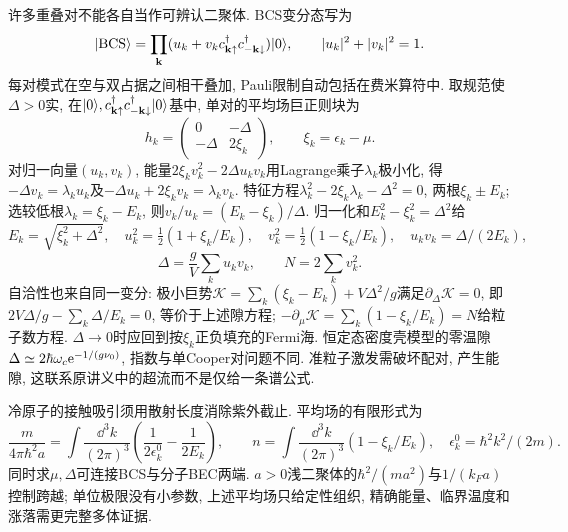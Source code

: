 许多重叠对不能各自当作可辨认二聚体. BCS变分态写为
\[\lvert \mathrm{BCS}\rangle=\prod_{\mathbf k}
 (u_k+v_kc_{\mathbf k\uparrow}^\dagger
                  c_{-\mathbf k\downarrow}^\dagger)\lvert 0\rangle,\qquad
 |u_k|^2+|v_k|^2=1.\]
每对模式在空与双占据之间相干叠加, Pauli限制自动包括在费米算符中. 取规范使$\Delta>0$实, 在$\lvert 0\rangle,c_{\mathbf k\uparrow}^\dagger c_{-\mathbf k\downarrow}^\dagger\lvert 0\rangle$基中, 单对的平均场巨正则块为
\[h_k=\begin{pmatrix}0&-\Delta\\-\Delta&2\xi_k\end{pmatrix},
 \qquad \xi_k=\epsilon_k-\mu.\]
对归一向量$(u_k,v_k)$, 能量$2\xi_kv_k^2-2\Delta u_kv_k$用Lagrange乘子$\lambda_k$极小化, 得$-\Delta v_k=\lambda_ku_k$及$-\Delta u_k+2\xi_kv_k=\lambda_kv_k$. 特征方程$\lambda_k^2-2\xi_k\lambda_k-\Delta^2=0$, 两根$\xi_k\pm E_k$; 选较低根$\lambda_k=\xi_k-E_k$, 则$v_k/u_k=(E_k-\xi_k)/\Delta$. 归一化和$E_k^2-\xi_k^2=\Delta^2$给
\[E_k=\sqrt{\xi_k^2+\Delta^2},\quad
 u_k^2=\tfrac12(1+\xi_k/E_k),\quad
 v_k^2=\tfrac12(1-\xi_k/E_k),\quad
 u_kv_k=\Delta/(2E_k),\]
\[\Delta=\frac gV\sum_ku_kv_k,\qquad N=2\sum_kv_k^2.\]
自洽性也来自同一变分: 极小巨势$\mathcal K=\sum_k(\xi_k-E_k)+V\Delta^2/g$满足$\partial_\Delta\mathcal K=0$, 即$2V\Delta/g-\sum_k\Delta/E_k=0$, 等价于上述隙方程; $-\partial_\mu\mathcal K=\sum_k(1-\xi_k/E_k)=N$给粒子数方程. $\Delta\to0$时应回到按$\xi_k$正负填充的Fermi海. 恒定态密度壳模型的零温隙$\Delta\simeq2\hbar\omega_c\mathrm e^{-1/(g\nu_0)}$, 指数与单Cooper对问题不同. 准粒子激发需破坏配对, 产生能隙, 这联系原讲义中的超流而不是仅给一条谱公式.

冷原子的接触吸引须用散射长度消除紫外截止. 平均场的有限形式为
\[\frac{m}{4\pi\hbar^2a}=\int\frac{\dd^3k}{(2\pi)^3}
 \left(\frac1{2\epsilon_k^0}-\frac1{2E_k}\right),\qquad
 n=\int\frac{\dd^3k}{(2\pi)^3}(1-\xi_k/E_k),\quad
 \epsilon_k^0=\hbar^2k^2/(2m).\]
同时求$\mu,\Delta$可连接BCS与分子BEC两端. $a>0$浅二聚体的$\hbar^2/(ma^2)$与$1/(k_Fa)$控制跨越; 单位极限没有小参数, 上述平均场只给定性组织, 精确能量、临界温度和涨落需更完整多体证据.
